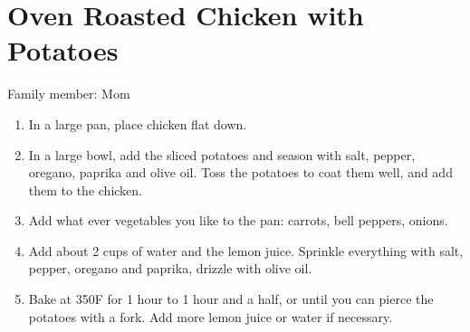 \chapter{Oven Roasted Chicken with Potatoes}
\label{ch:chickenandpotatoes}

Family member: Mom


\begin{enumerate}
    \item In a large pan, place chicken flat down.
    \item In a large bowl, add the sliced potatoes and season with salt, pepper, oregano, paprika and olive oil. Toss the potatoes to coat them well, and add them to the chicken.
    \item Add what ever vegetables you like to the pan: carrots, bell peppers, onions.
    \item Add about 2 cups of water and the lemon juice. Sprinkle everything with salt, pepper, oregano and paprika, drizzle with olive oil.
    \item Bake at 350\degree F for 1 hour to 1 hour and a half, or until you can pierce the potatoes with a fork. Add more lemon juice or water if necessary.
\end{enumerate}